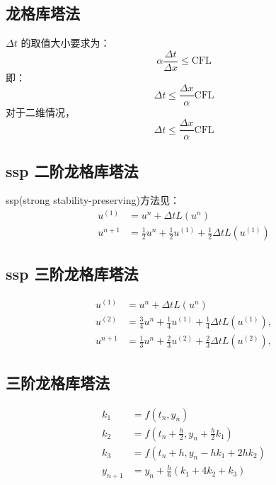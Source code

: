 \documentclass{article}
\numberwithin{equation}{subsection}    %
\begin{document}
\begin{appendix}
    \section{龙格库塔法}
    $\Delta t$ 的取值大小要求为：\cite{RN109}
    \begin{equation}
        \alpha \frac{\Delta t}{\Delta x} \leq \text{CFL}
    \end{equation}
    即：
    \begin{equation}
        \Delta t \leqslant \frac{\Delta x}{\alpha}\text{CFL}
    \end{equation}
    对于二维情况，
    \begin{equation}
        \Delta t \leqslant \frac{\Delta x}{\alpha}\text{CFL}
    \end{equation}

    \subsection{ssp 二阶龙格库塔法}
    ssp(strong stability-preserving)方法见：\cite{RN96}
    \begin{equation}
        \begin{aligned}
            u^{(1)} & =u^{n}+\Delta t L\left(u^{n}\right)                                               \\
            u^{n+1} & =\frac{1}{2} u^{n}+\frac{1}{2} u^{(1)}+\frac{1}{2} \Delta t L\left(u^{(1)}\right)
        \end{aligned}
    \end{equation}
    \subsection{ssp 三阶龙格库塔法}
    \begin{equation}
        \begin{aligned}
            u^{(1)} & =u^{n}+\Delta t L\left(u^{n}\right)                                                \\
            u^{(2)} & =\frac{3}{4} u^{n}+\frac{1}{4} u^{(1)}+\frac{1}{4} \Delta t L\left(u^{(1)}\right), \\
            u^{n+1} & =\frac{1}{3} u^{n}+\frac{2}{3} u^{(2)}+\frac{2}{3} \Delta t L\left(u^{(2)}\right),
        \end{aligned}
    \end{equation}
    \subsection{三阶龙格库塔法}
    \begin{equation}
        \begin{aligned}
            k_1     & = f(t_n, y_n)                                \\
            k_2     & = f(t_n + \frac{h}{2}, y_n + \frac{h}{2}k_1) \\
            k_3     & = f(t_n + h, y_n - hk_1 + 2hk_2)             \\
            y_{n+1} & = y_n + \frac{h}{6}(k_1 + 4k_2 + k_3)        \\
        \end{aligned}
    \end{equation}


\end{appendix}
\end{document}
